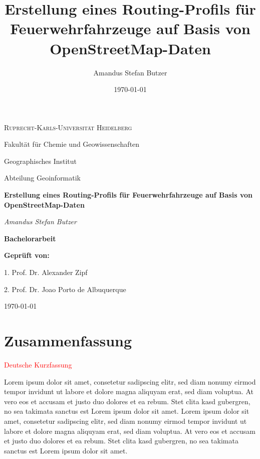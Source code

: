 \documentclass[12pt,a4paper]{article}
\author{Amandus Stefan Butzer}
\title{Erstellung eines Routing-Profils für Feuerwehrfahrzeuge auf Basis von OpenStreetMap-Daten}
\date{\today}
\newcommand\todo[1]{\textcolor{red}{#1}}
\begin{document}
\begin{titlepage}
\begin{center}

	{\scshape\LARGE Ruprecht-Karls-Universität Heidelberg\par}
	\vspace{1.0cm}
	{\large Fakultät für Chemie und Geowissenschaften \par Geographisches Institut \par Abteilung Geoinformatik\par}
	\vspace{2.5cm}
	{\Huge\bfseries Erstellung eines Routing-Profils für Feuerwehrfahrzeuge auf Basis von OpenStreetMap-Daten\par}
	\vspace{2cm}
	{\Large\itshape Amandus Stefan Butzer\par}
	\vspace{2cm}
	{\LARGE\bfseries Bachelorarbeit\par}
	
	\vfill
	{\bfseries Geprüft von:}
	{\par 1. Prof. Dr. Alexander Zipf}
	{\par 2. Prof. Dr. Joao Porto de Albuquerque}

	\vfill

	{\large \today\par}
\end{center}
\end{titlepage}

\newpage
{}

{\centering\section*{Zusammenfassung}}
\todo{Deutsche Kurzfassung}\par
Lorem ipsum dolor sit amet, consetetur sadipscing elitr, sed diam nonumy eirmod tempor invidunt ut labore et dolore magna aliquyam erat, sed diam voluptua. At vero eos et accusam et justo duo dolores et ea rebum. Stet clita kasd gubergren, no sea takimata sanctus est Lorem ipsum dolor sit amet. Lorem ipsum dolor sit amet, consetetur sadipscing elitr, sed diam nonumy eirmod tempor invidunt ut labore et dolore magna aliquyam erat, sed diam voluptua. At vero eos et accusam et justo duo dolores et ea rebum. Stet clita kasd gubergren, no sea takimata sanctus est Lorem ipsum dolor sit amet.
\end{document}
